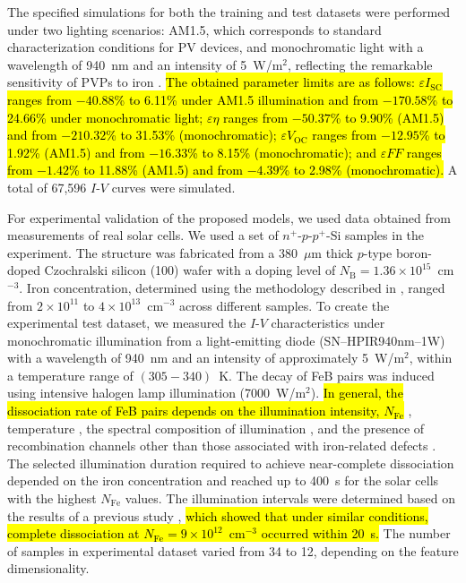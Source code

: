 \documentclass[a4paper,fleqn,draft]{cas-sc}
\begin{document}
The specified simulations for both the training and test datasets were performed under two lighting scenarios:
AM1.5, which corresponds to standard characterization conditions for PV devices,
and monochromatic light with a wavelength of 940~nm and an intensity of 5~W/m$^{2}$,
reflecting the remarkable sensitivity of PVPs to iron \cite{Olikh2025MSEB}.
\textcolor[rgb]{1.00,0.07,0.00}{
\hl{
The obtained parameter limits are as follows:
$\varepsilon I_\mathrm{SC}$ ranges from $-40.88$\% to 6.11\% under AM1.5 illumination and
from $-170.58$\% to 24.66\% under monochromatic light;
$\varepsilon \eta$ ranges from $-50.37$\% to 9.90\% (AM1.5)
and from $-210.32$\% to 31.53\% (monochromatic);
$\varepsilon V_\mathrm{OC}$ ranges from $-12.95$\% to 1.92\%  (AM1.5) and
from $-16.33$\% to 8.15\% (monochromatic);
and $\varepsilon F\!F$ ranges from $-1.42$\% to 11.88\% (AM1.5) and
from $-4.39$\% to 2.98\% (monochromatic).
}}
A total of 67,596 $I$-$V$ curves were simulated.

For experimental validation of the proposed models, we used data obtained from measurements of real solar cells.
We used a set of $n^+$-$p$-$p^+$-Si samples in the experiment.
The structure was fabricated from a 380~$\mu$m thick $p$-type boron-doped Czochralski silicon (100) wafer
with a doping level of $N_\mathrm{B}=1.36\times10^{15}$~cm$^{-3}$.
Iron concentration, determined using the methodology described in \cite{Olikh2022:JMatSci, Olikh2021JAP},
ranged from $2\times10^{11}$ to $4\times10^{13}$~cm$^{-3}$ across different samples.
To create the experimental test dataset,
we measured the $I$-$V$ characteristics under monochromatic illumination from a light-emitting diode (SN–HPIR940nm–1W)
with a wavelength of 940~nm and an intensity of approximately 5~W/m$^{2}$, within a temperature range of $(305-340)$~K.
The decay of FeB pairs was induced using intensive halogen lamp illumination (7000~W/m$^{2}$).
\textcolor[rgb]{1.00,0.07,0.00}{
\hl{
In general, the dissociation rate of FeB pairs depends on the illumination intensity, $N_\mathrm{Fe}$ }
\cite{FeBLight2,FeBAssJAP2014,FeMethod2012},
temperature \cite{lauer2016},
the spectral composition of illumination \cite{OlikhPSSA},
and the presence of recombination channels other than those associated with iron-related defects \cite{FeBLight2,FeBAssJAP2014}.
The selected illumination duration required to achieve near-complete dissociation depended on the iron concentration
and reached up to 400~s for the solar cells with the highest $N_\mathrm{Fe}$ values.
The illumination intervals were determined based on the results of a previous study \cite{OlikhPSSA},
\hl{which showed that under similar conditions, complete dissociation at $N_\mathrm{Fe}=9\times10^{12}$~cm$^{-3}$ occurred within 20~s.
}}
The number of samples in experimental dataset varied from 34 to 12, depending on the feature dimensionality.
\end{document}
